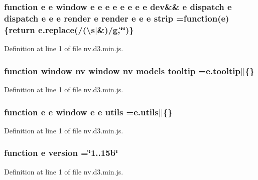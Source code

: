 \subsubsection[{strip}]{\setlength{\rightskip}{0pt plus 5cm}function {\bf e} {\bf e} {\bf window} {\bf e} {\bf e} {\bf e} {\bf e} {\bf e} {\bf e} {\bf e} {\bf e} {\bf dev}\&\& {\bf e} {\bf dispatch} {\bf e} {\bf dispatch} {\bf e} {\bf e} {\bf e} {\bf render} {\bf e} {\bf render} {\bf e} {\bf e} {\bf e} strip =function({\bf e})\{{\bf return} e.\+replace(/(\textbackslash{}s$\vert$\&)/g,\char`\"{}\char`\"{})\}}\label{nv_8d3_8min_8js_a4725b1eda9ae3fec57b8ab1049581884}


Definition at line 1 of file nv.\+d3.\+min.\+js.

\subsubsection[{tooltip}]{\setlength{\rightskip}{0pt plus 5cm}function {\bf window} {\bf nv} {\bf window} {\bf nv} {\bf models} tooltip =e.\+tooltip$\vert$$\vert$\{\}}\label{nv_8d3_8min_8js_ad13baac4ad7b2c6a3c20631545e7caa4}


Definition at line 1 of file nv.\+d3.\+min.\+js.

\subsubsection[{utils}]{\setlength{\rightskip}{0pt plus 5cm}function {\bf e} {\bf e} {\bf window} {\bf e} {\bf e} utils =e.\+utils$\vert$$\vert$\{\}}\label{nv_8d3_8min_8js_aa9f8af37b01d868ad3fe2ccd5ba91bff}


Definition at line 1 of file nv.\+d3.\+min.\+js.

\subsubsection[{version}]{\setlength{\rightskip}{0pt plus 5cm}function {\bf e} version =\char`\"{}1..\+15b\char`\"{}}\label{nv_8d3_8min_8js_a2cefed937af2d3d3bab42ef7ef3fa91e}


Definition at line 1 of file nv.\+d3.\+min.\+js.

